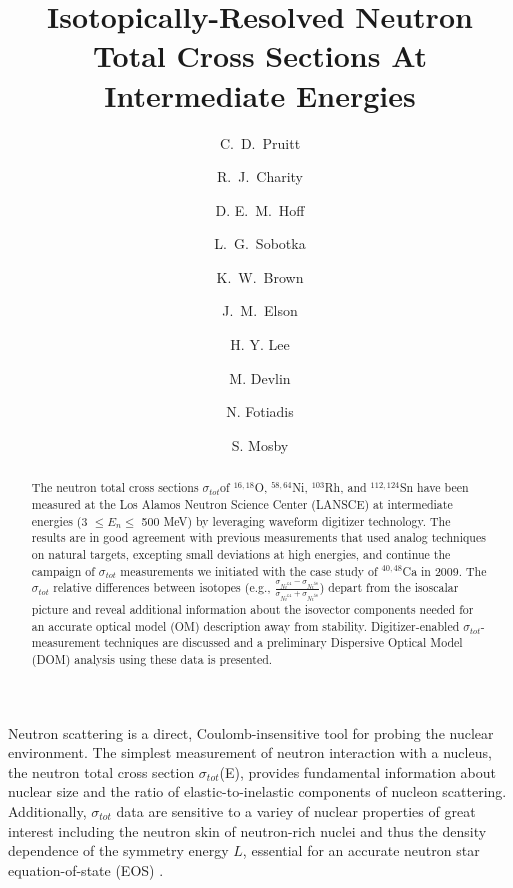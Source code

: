 \documentclass[twocolumn,secnumarabic,amssymb, nobibnotes, aps, prl,
superscriptaddress, nobalancelastpage]{revtex4}
\newcommand{\tot}{\ensuremath{\sigma_{tot}}}
\newcommand{\tots}{\ensuremath{\sigma_{tot}}\,\,}
\newcommand{\totE}{\ensuremath{\sigma_{tot}}(E)}
\begin{document}
\begin{abstract}
    The neutron total cross sections \tot of $^{16,18}$O,
    $^{58,64}$Ni, $^{103}$Rh, and $^{112,124}$Sn have been measured at the Los Alamos
    Neutron Science Center (LANSCE) at intermediate energies (3 $\leq E_{n}
    \leq$ 500 MeV) by
    leveraging waveform digitizer technology. The results are in good agreement
    with previous measurements that used analog techniques on natural targets,
    excepting small deviations at high energies, and continue the campaign of
    \tots measurements we initiated with the case study of $^{40,48}$Ca in 2009.
    The \tots relative differences between isotopes (e.g.,
    $\frac{\sigma_{Ni^{64}}-\sigma_{Ni^{58}}} {\sigma_{Ni^{64}}+
    \sigma_{Ni^{58}}}$)
    depart from the isoscalar picture and reveal additional information about
    the isovector components needed for an accurate optical model (OM)
    description away from stability. Digitizer-enabled \tot-measurement
    techniques are discussed and a preliminary Dispersive Optical Model (DOM)
    analysis using these data is presented.
\end{abstract}

\title{Isotopically-Resolved Neutron Total Cross Sections At
Intermediate Energies}

\author{C.~D.~Pruitt}  
\author{R.~J.~Charity}
\author{D. E.~M.~Hoff}  
\author{L.~G.~Sobotka}
\author{K.~W.~Brown} 
\author{J.~M.~Elson}

\author{H. Y. Lee}
\author{M. Devlin}
\author{N. Fotiadis}
\author{S. Mosby}
\maketitle

Neutron scattering is a direct, Coulomb-insensitive tool for probing the nuclear
environment. The simplest measurement of neutron interaction with a nucleus,
the neutron total cross section \totE, provides fundamental information about
nuclear size and the ratio of elastic-to-inelastic components of nucleon 
scattering. Additionally, \tots data are sensitive to a variey of nuclear
properties of great interest including the neutron skin of neutron-rich nuclei
\cite{Mahzoon2017} and thus the density dependence of the symmetry energy $L$,
essential for an accurate neutron star equation-of-state (EOS)
\cite{Fattoyev2012, Vinas2014, Brown2000}.
\end{document}
